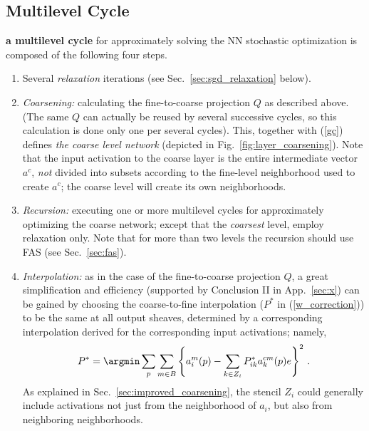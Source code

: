 \documentclass{article} %
\begin{document}
\subsection{Multilevel Cycle}
\label{sec:multilevel_cycle}
{\bf a multilevel cycle} for approximately solving the NN stochastic optimization is composed of the following four steps.
\begin{enumerate}
    \item Several {\it relaxation} iterations (see Sec.~\ref{sec:sgd_relaxation} below).
    \item {\it Coarsening:} calculating the fine-to-coarse projection $Q$ as described above. (The same $Q$ can actually be reused by several successive cycles, so this calculation is done only one per several cycles). This, together with (\ref{gc}) defines {\it the coarse level network} (depicted in Fig.~\ref{fig:layer_coarsening}). Note that the input activation to the coarse layer is the entire intermediate vector $a^c$, {\it not} divided into subsets according to the fine-level neighborhood used to create $a^c$; the coarse level will create its own neighborhoods.
    \item {\it Recursion:} executing one or more multilevel cycles for approximately optimizing the coarse network; except that the {\it coarsest} level, employ relaxation only. Note that for more than two levels the recursion should use FAS (see Sec.~\ref{sec:fas}).
    \item {\it Interpolation:} as in the case of the fine-to-coarse projection $Q$, a great simplification and efficiency (supported by Conclusion II in App.~\ref{sec:x}) can be gained by choosing the coarse-to-fine interpolation ($P^*$ in (\ref{w_correction})) to be the same at all output sheaves, determined by a corresponding interpolation derived for the corresponding input activations; namely,
    \begin{equation}
        P^* = \argmin \sum_p \sum_{m \in B} \left\{ a^m_i(p) - \sum_{k \in Z_i} P^*_{ik} a^{cm}_k(p)e\right\}^2\,.
        \label{pstar_fit}
    \end{equation}
    As explained in Sec.~\ref{sec:improved_coarsening}, the stencil $Z_i$ could generally include activations not just from the neighborhood of $a_i$, but also from neighboring neighborhoods.
\end{enumerate}
\end{document}
